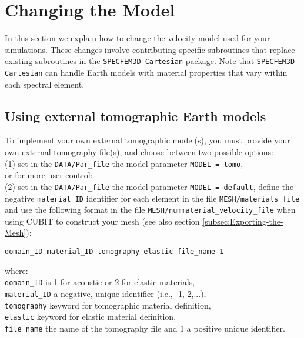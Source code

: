 \chapter{Changing the Model}\label{cha:-Changing-the}

In this section we explain how to change the velocity model used for
your simulations. These changes involve contributing specific subroutines
that replace existing subroutines in the \texttt{SPECFEM3D Cartesian}
package. Note that \texttt{SPECFEM3D Cartesian} can handle Earth models
with material properties that vary within each spectral element.


\section{Using external tomographic Earth models}\label{sec:Using-tomographic}

To implement your own external tomographic model(s), you must provide
your own external tomography file(s), and choose between two possible
options:\\
 \indent (1) set in the \texttt{DATA/Par\_file} the model parameter \texttt{MODEL
= tomo}, \\
 or for more user control: \\
 \indent (2) set in the \texttt{DATA/Par\_file} the model parameter \texttt{MODEL
= default}, define the negative \texttt{material\_ID} identifier for
each element in the file \texttt{MESH/materials\_file} and use the
following format in the file \texttt{MESH/nummaterial\_velocity\_file}
when using CUBIT to construct your mesh (see also section \ref{subsec:Exporting-the-Mesh}):
\begin{verbatim}
domain_ID material_ID tomography elastic file_name 1
\end{verbatim}
where: \\
 \indent \texttt{domain\_ID} is 1 for acoustic or 2 for elastic materials,
\\
 \indent \texttt{material\_ID} a negative, unique identifier (i.e.,
-1,-2,...), \\
 \indent \texttt{tomography} keyword for tomographic material definition,
\\
 \indent \texttt{elastic} keyword for elastic material definition,
\\
 \indent \texttt{file\_name} the name of the tomography file and
1 a positive unique identifier.\\


